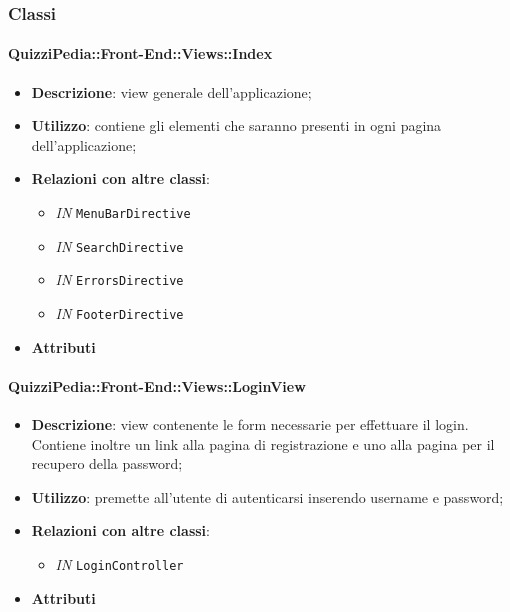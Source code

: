 \subsubsection{Classi}

\paragraph{QuizziPedia::Front-End::Views::Index}
\begin{itemize}
	\item \textbf{Descrizione}:  view generale dell'applicazione;
	\item \textbf{Utilizzo}: contiene gli elementi che saranno presenti in ogni pagina dell'applicazione;
	\item \textbf{Relazioni con altre classi}:
	\begin{itemize}
		\item \textit{IN} \texttt{MenuBarDirective} \\
		\item \textit{IN} \texttt{SearchDirective} \\
		\item \textit{IN} \texttt{ErrorsDirective} \\
		\item \textit{IN} \texttt{FooterDirective} \\ 
	\end{itemize}
	\item \textbf{Attributi}
\end{itemize}

\paragraph{QuizziPedia::Front-End::Views::LoginView}
\begin{itemize}
	\item \textbf{Descrizione}: view contenente le form necessarie per effettuare il login. Contiene inoltre un link alla pagina di registrazione e uno alla pagina per il recupero della password;
	\item \textbf{Utilizzo}: premette all'utente di autenticarsi inserendo username e password;
	\item \textbf{Relazioni con altre classi}:
	\begin{itemize}
		\item \textit{IN} \texttt{LoginController} \\ 
	\end{itemize}
	\item \textbf{Attributi}
\end{itemize}

